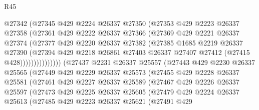 \begin{lexlean}{R45}
\begin{coremodule}
                      @27342
                      (@27345
                        @429
                        @2224
                        @26337
                        @27350
                        (@27353
                          @429
                          @2223
                          @26337
                          @27358
                          (@27361
                            @429
                            @2222
                            @26337
                            @27366
                            (@27369
                              @429
                              @2221
                              @26337
                              @27374
                              (@27377
                                @429
                                @2220
                                @26337
                                @27382
                                (@27385
                                  @1685
                                  @2219
                                  @26337
                                  @27390
                                  (@27394
                                    @429
                                    @2218
                                    @26861
                                    @27403
                                    @26337
                                    @27407
                                    @27412
                                    (@27415 @428)))))))))))))))
        (@27437
          @2231
          @26337
          @25557
          (@27443
            @429
            @2230
            @26337
            @25565
            (@27449
              @429
              @2229
              @26337
              @25573
              (@27455
                @429
                @2228
                @26337
                @25581
                (@27461
                  @429
                  @2227
                  @26337
                  @25589
                  (@27467
                    @429
                    @2226
                    @26337
                    @25597
                    (@27473
                      @429
                      @2225
                      @26337
                      @25605
                      (@27479
                        @429
                        @2224
                        @26337
                        @25613
                        (@27485
                          @429
                          @2223
                          @26337
                          @25621
                          (@27491
                            @429

\end{coremodule}
\end{lexlean}
